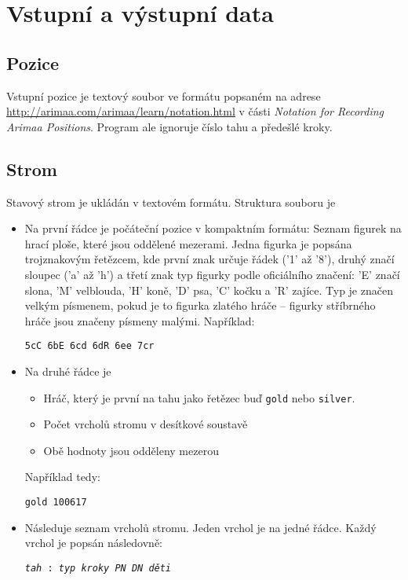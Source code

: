 \documentclass{article}
\begin{document}
\section{Vstupní a výstupní data}
\subsection{Pozice}
Vstupní pozice je textový soubor ve formátu popsaném na adrese \url{http://arimaa.com/arimaa/learn/notation.html} v
části \emph{Notation for Recording Arimaa Positions}. Program ale ignoruje číslo tahu a předešlé kroky.

\subsection{Strom}
Stavový strom je ukládán v textovém formátu. Struktura souboru je \begin{itemize}
  \item Na první řádce je počáteční pozice v kompaktním formátu: Seznam figurek na hrací ploše, které jsou oddělené
  mezerami. Jedna figurka je popsána trojznakovým řetězcem, kde první znak určuje řádek ('1' až '8'), druhý značí
  sloupec ('a' až 'h') a třetí znak typ figurky podle oficiálního značení: 'E' značí slona, 'M' velblouda, 'H' koně, 'D'
  psa, 'C' kočku a 'R' zajíce. Typ je značen velkým písmenem, pokud je to figurka zlatého hráče -- figurky stříbrného
  hráče jsou značeny písmeny malými. Například: \begin{center}\verb+5cC 6bE 6cd 6dR 6ee 7cr+\end{center}
  \item Na druhé řádce je \begin{itemize}
    \item Hráč, který je první na tahu jako řetězec buď \texttt{gold} nebo \texttt{silver}.
    \item Počet vrcholů stromu v desítkové soustavě
    \item Obě hodnoty jsou odděleny mezerou
  \end{itemize}
  Například tedy: \begin{center}\verb+gold 100617+\end{center}
  \item Následuje seznam vrcholů stromu. Jeden vrchol je na jedné řádce. Každý vrchol je popsán
  následovně: \begin{center}\texttt{\textit{tah} : \textit{typ} \textit{kroky} \textit{PN}
  \textit{DN} \textit{děti}}\end{center}

\end{itemize}
\end{document}
